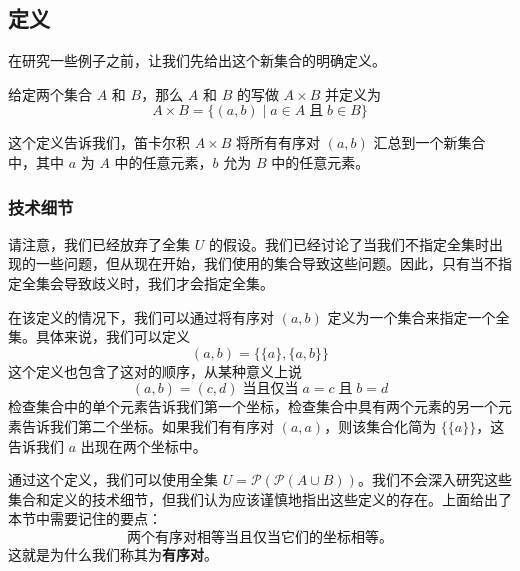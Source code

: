 \subsection{定义}

在研究一些例子之前，让我们先给出这个新集合的明确定义。

\begin{definition}
    给定两个集合 $A$ 和 $B$，那么 $A$ 和 $B$ 的写做 $A \times B$ 并定义为
    \[A \times B = \{(a, b) \mid a \in A \;\text{且}\; b \in B\}\]
\end{definition}

这个定义告诉我们，笛卡尔积 $A \times B$ 将所有有序对 $(a, b)$ 汇总到一个新集合中，其中 $a$ 为 $A$ 中的任意元素，$b$ 允为 $B$ 中的任意元素。

\subsubsection*{技术细节}

请注意，我们已经放弃了全集 $U$ 的假设。我们已经讨论了当我们不指定全集时出现的一些问题，但从现在开始，我们使用的集合导致这些问题。因此，只有当不指定全集会导致歧义时，我们才会指定全集。

在该定义的情况下，我们可以通过将有序对 $(a, b)$ 定义为一个集合来指定一个全集。具体来说，我们可以定义
\[(a, b) = \{ \{a\}, \{a, b\} \}\]
这个定义也包含了这对的顺序，从某种意义上说
\[(a, b) = (c, d) \;\text{当且仅当}\; a = c \;\text{且}\; b = d\]
检查集合中的单个元素告诉我们第一个坐标，检查集合中具有两个元素的另一个元素告诉我们第二个坐标。如果我们有有序对 $(a, a)$，则该集合化简为 $\{\{a\}\}$，这告诉我们 $a$ 出现在两个坐标中。

通过这个定义，我们可以使用全集 $U = \mathcal{P}(\mathcal{P}(A \cup B))$。我们不会深入研究这些集合和定义的技术细节，但我们认为应该谨慎地指出这些定义的存在。上面给出了本节中需要记住的要点：
\[\text{两个有序对相等当且仅当它们的坐标相等。}\]
这就是为什么我们称其为\textbf{有序对}。

